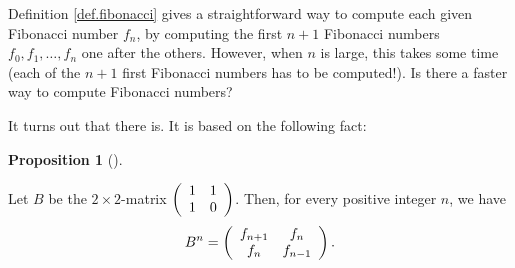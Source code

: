 \documentclass[numbers=enddot,12pt,final,onecolumn,notitlepage]{scrartcl}%
\theoremstyle{definition}
\newtheorem{prop}[theo]{Proposition}
\newenvironment{proposition}[1][]
{\begin{prop}[#1]\begin{leftbar}}
{\end{leftbar}\end{prop}}
\begin{document}
Definition \ref{def.fibonacci} gives a straightforward way to compute each
given Fibonacci number $f_{n}$, by computing the first $n+1$ Fibonacci numbers
$f_{0},f_{1},\ldots,f_{n}$ one after the others. However, when $n$ is large,
this takes some time (each of the $n+1$ first Fibonacci numbers has to be
computed!). Is there a faster way to compute Fibonacci numbers?

It turns out that there is. It is based on the following fact:

\begin{proposition}
\label{prop.fibonacci.matrix}Let $B$ be the $2\times2$-matrix $\left(
\begin{array}
[c]{cc}%
1 & 1\\
1 & 0
\end{array}
\right)  $. Then, for every positive integer $n$, we have%
\begin{equation}
B^{n}=\left(
\begin{array}
[c]{cc}%
f_{n+1} & f_{n}\\
f_{n} & f_{n-1}%
\end{array}
\right)  . \label{eq.prop.fibonacci.matrix.1}%
\end{equation}

\end{proposition}
\end{document}
